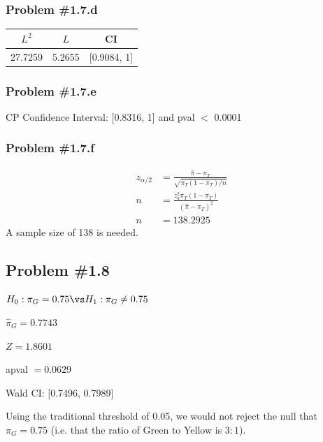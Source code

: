 \documentclass[12pt, letterpaper]{article}
\begin{document}
\subsubsection*{Problem {\#}1.7.d} 
\begin{tabular}{c c  c}
	$L^2$ & $L$ & CI \\ \hline 
	27.7259 & 5.2655  & [0.9084, 1]
\end{tabular}
\subsubsection*{Problem {\#}1.7.e} 
CP Confidence Interval: [0.8316, 1]  and pval $<$ 0.0001 
\subsubsection*{Problem {\#}1.7.f} 
\begin{align*}
z_{\alpha/2} &= \frac{\hat{\pi} - \pi_T}{ \sqrt{ \pi_T(1 - \pi_T) / n}} 
\\[0.5ex]
n & = \frac{ z_a^2 \pi_T (1 - \pi_T) }{ (\hat{\pi} - \pi_T)^2} 
\\[0.5ex]
n & = 138.2925
\end{align*}
A sample size of 138 is needed.  

\subsection*{Problem {\#}1.8} 
$H_0: \pi_G = 0.75 \vs H_1: \pi_G \neq 0.75$ 

$\hat{\pi}_G = 0.7743$ 

$Z = 1.8601$   

apval $= 0.0629$  

Wald CI: [0.7496, 0.7989]  

Using the traditional threshold of 0.05, we would not reject the null that $\pi_G = 0.75$ (i.e. that the ratio of Green to Yellow is $3:1$).  
\end{document}
